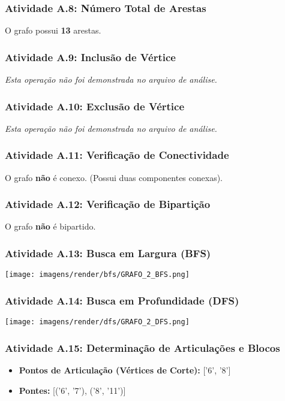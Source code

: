 \documentclass[a4paper,12pt]{article}
\begin{document}
\subsubsection*{Atividade A.8: Número Total de Arestas}
O grafo possui \textbf{13} arestas.

\subsubsection*{Atividade A.9: Inclusão de Vértice}
\textit{Esta operação não foi demonstrada no arquivo de análise.}

\subsubsection*{Atividade A.10: Exclusão de Vértice}
\textit{Esta operação não foi demonstrada no arquivo de análise.}

\subsubsection*{Atividade A.11: Verificação de Conectividade}
O grafo \textbf{não} é conexo. (Possui duas componentes conexas).

\subsubsection*{Atividade A.12: Verificação de Bipartição}
O grafo \textbf{não} é bipartido.

\subsubsection*{Atividade A.13: Busca em Largura (BFS)}
\begin{center}
    \texttt{[image: imagens/render/bfs/GRAFO\_2\_BFS.png]}
\end{center}

\subsubsection*{Atividade A.14: Busca em Profundidade (DFS)}
\begin{center}
    \texttt{[image: imagens/render/dfs/GRAFO\_2\_DFS.png]}
\end{center}

\subsubsection*{Atividade A.15: Determinação de Articulações e Blocos}
\begin{itemize}[nosep, leftmargin=*]
    \item \textbf{Pontos de Articulação (Vértices de Corte):} ['6', '8']
    \item \textbf{Pontes:} [('6', '7'), ('8', '11')]
\end{itemize}
\end{document}
